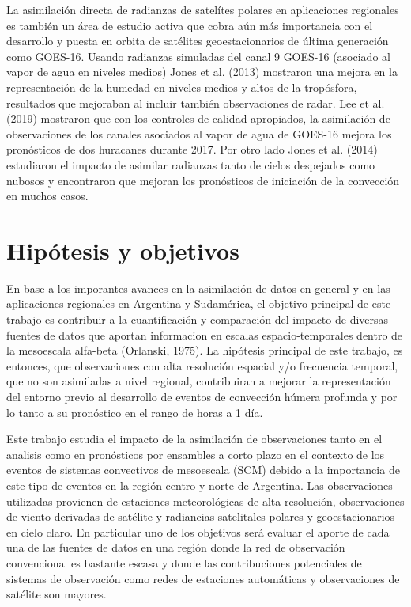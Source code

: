\documentclass[12pt,oneside,a4paper]{reedthesis}
\begin{document}
La asimilación directa de radianzas de satelítes polares en aplicaciones regionales es también un área de estudio activa que cobra aún más importancia con el desarrollo y puesta en orbita de satélites geoestacionarios de última generación como GOES-16. Usando radianzas simuladas del canal 9 GOES-16 (asociado al vapor de agua en niveles medios) Jones et al. (2013) mostraron una mejora en la representación de la humedad en niveles medios y altos de la tropósfora, resultados que mejoraban al incluir también observaciones de radar. Lee et al. (2019) mostraron que con los controles de calidad apropiados, la asimilación de observaciones de los canales asociados al vapor de agua de GOES-16 mejora los pronósticos de dos huracanes durante 2017. Por otro lado Jones et al. (2014) estudiaron el impacto de asimilar radianzas tanto de cielos despejados como nubosos y encontraron que mejoran los pronósticos de iniciación de la convección en muchos casos.

\hypertarget{hipuxf3tesis-y-objetivos}{%
\section{Hipótesis y objetivos}\label{hipuxf3tesis-y-objetivos}}

En base a los imporantes avances en la asimilación de datos en general y en las aplicaciones regionales en Argentina y Sudamérica, el objetivo principal de este trabajo es contribuir a la cuantificación y comparación del impacto de diversas fuentes de datos que aportan informacion en escalas espacio-temporales dentro de la mesoescala alfa-beta (Orlanski, 1975). La hipótesis principal de este trabajo, es entonces, que observaciones con alta resolución espacial y/o frecuencia temporal, que no son asimiladas a nivel regional, contribuiran a mejorar la representación del entorno previo al desarrollo de eventos de convección húmera profunda y por lo tanto a su pronóstico en el rango de horas a 1 día.

Este trabajo estudia el impacto de la asimilación de observaciones tanto en el analisis como en pronósticos por ensambles a corto plazo en el contexto de los eventos de sistemas convectivos de mesoescala (SCM) debido a la importancia de este tipo de eventos en la región centro y norte de Argentina. Las observaciones utilizadas provienen de estaciones meteorológicas de alta resolución, observaciones de viento derivadas de satélite y radiancias satelitales polares y geoestacionarios en cielo claro. En particular uno de los objetivos será evaluar el aporte de cada una de las fuentes de datos en una región donde la red de observación convencional es bastante escasa y donde las contribuciones potenciales de sistemas de observación como redes de estaciones automáticas y observaciones de satélite son mayores.
\end{document}

